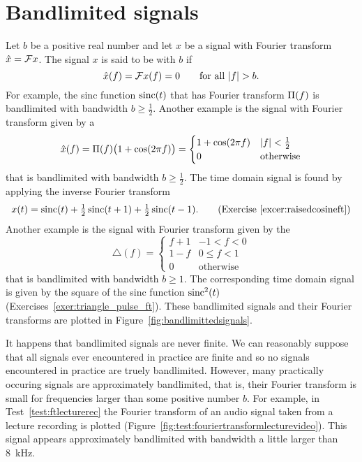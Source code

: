 \section{Bandlimited signals}\label{sec:bandlimited-signals}

Let $b$ be a positive real number and let $x$ be a signal with Fourier transform $\hat{x} = {\mathcal F} x$.  The signal $x$ is said to be  with  $b$ if 
\[
\hat{x}(f) = {\mathcal F} x(f) = 0 \qquad \text{for all $\left\vert f \right\vert > b$}.
\]  
For example, the sinc function $\operatorname{sinc}(t)$ that has Fourier transform $\Pi(f)$ is bandlimited with bandwidth $b \geq \tfrac{1}{2}$.  Another example is the signal with Fourier transform given by a~
\[
\hat{x}(f) = \Pi(f) \big(1 + \cos( 2 \pi f )\big) = \begin{cases}
1 + \cos( 2\pi f ) & \left\vert f \right\vert < \tfrac{1}{2} \\
0 & \text{otherwise}
\end{cases}
\]
that is bandlimited with bandwidth $b \geq \tfrac{1}{2}$.  The time domain signal is found by applying the inverse Fourier transform 
\[
x(t) = \sinc(t)+\tfrac{1}{2}\sinc(t+1)+\tfrac{1}{2}\sinc(t-1). \qquad \text{(Exercise~\ref{excer:raisedcosineft})}%
\]
Another example is the signal with Fourier transform given by the~
\[
\bigtriangleup(f) = \begin{cases}
f + 1 & -1 < f < 0 \\
1 - f & 0 \leq f < 1 \\
0 & \text{otherwise}
\end{cases}
\]
that is bandlimited with bandwidth $b \geq 1$.  The corresponding time domain signal is given by the square of the sinc function $\operatorname{sinc}^2(t)$ (Exercises~\ref{exer:triangle_pulse_ft}).  These bandlimited signals and their Fourier transforms are plotted in Figure~\ref{fig:bandlimittedsignals}.

It happens that bandlimited signals are never finite.  We can reasonably suppose that all signals ever encountered in practice are finite and so no signals encountered in practice are truely bandlimited.  However, many practically occuring signals are approximately bandlimited, that is, their Fourier transform is small for frequencies larger than some positive number $b$.  For example, in Test~\ref{test:ftlecturerec} the Fourier transform of an audio signal taken from a lecture recording is plotted  (Figure~\ref{fig:test:fouriertransformlecturevideo}).  This signal appears approximately bandlimited with bandwidth a little larger than \SI{8}{\kilo\hertz}.

